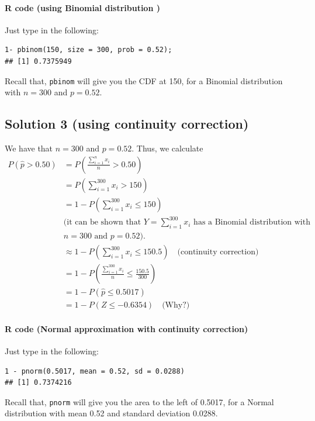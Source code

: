 \paragraph*{R code (using Binomial distribution )}

Just type in the following:

\begin{verbatim}
1- pbinom(150, size = 300, prob = 0.52);
## [1] 0.7375949
\end{verbatim}

Recall that, \texttt{pbinom} will give you the CDF at 150, for a Binomial distribution with $n = 300$ and $p = 0.52$.

\subsection*{Solution 3 (using continuity correction)}


We have that $n = 300$ and $p = 0.52$.
Thus, we calculate
\begin{align*}
P(\hat{p} > 0.50) &= P\left( \frac{\sum_{i=1}^{n} x_i}{n} > 0.50 \right) \\
&= P\left( \sum_{i=1}^{300} x_i > 150 \right) \\
&= 1 - P\left( \sum_{i=1}^{300} x_i \leq 150 \right) \\
&\text{(it can be shown that } Y = \sum_{i=1}^{300} x_i \text{ has a Binomial distribution with} \\
&n = 300 \text{ and } p = 0.52\text{)}. \\
&\approx 1 - P\left( \sum_{i=1}^{300} x_i \leq 150.5 \right) \quad \text{(continuity correction)} \\
&= 1 - P\left( \frac{\sum_{i=1}^{300} x_i}{n} \leq \frac{150.5}{300} \right) \\
&= 1 - P(\hat{p} \leq 0.5017) \\
&= 1 - P\left( Z \leq -0.6354 \right) \quad \text{(Why?)}
\end{align*}
\paragraph*{R code (Normal approximation with continuity correction)}

Just type in the following:

\begin{verbatim}
1 - pnorm(0.5017, mean = 0.52, sd = 0.0288)
## [1] 0.7374216
\end{verbatim}

Recall that, \texttt{pnorm} will give you the area to the left of 0.5017, for a Normal distribution with mean 0.52 and standard deviation 0.0288.

